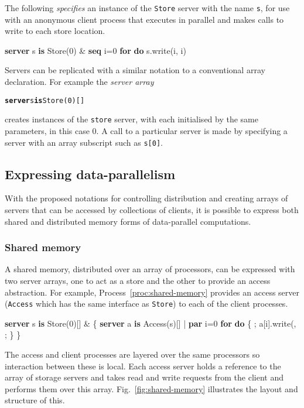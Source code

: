 \documentclass[11pt, conference, compsocconf, onecolumn]{IEEEtran}
\newcommand{\ttt}[1]{\texttt{#1}}
\newcommand{\fig}[1]{Fig.~\ref{fig:#1}}
\newcommand{\proc}[1]{Process~\ref{proc:#1}}
\newcounter{process}
\newenvironment{Process}[1][]{\begin{procfloat}[ht]\vspace{-1.5mm}\refstepcounter{process}{\bf Process~\theprocess} #1}
{\vspace{-3.5mm}\end{procfloat}}
\newcommand{\w}[1]{{\bf #1}}
\newcommand{\inputtikz}[1]{
\begin{center}\end{center}}
\def\codespacing{1.5mm}
\newenvironment{myquote}
{\list{}{\leftmargin=4mm\rightmargin=4mm}\item[]}
{\endlist}
\newenvironment{code*}{\vspace{\codespacing}\begin{myquote}\begin{minipage}{\linewidth}\begin{alltt}}
{\end{alltt}\end{minipage}
\end{myquote}\vspace{\codespacing}
}
\newcommand{\code}[1]{
\vspace{\codespacing}\begin{myquote}\begin{alltt}#1\end{alltt}\end{myquote}\vspace{\codespacing}
}
\begin{document}
The following \emph{specifies} an instance of the \ttt{Store} server with the
name \ttt{s}, for use with an anonymous client process that executes in
parallel and makes calls to write to each store location.
\begin{code*}
\w{server} s \w{is} Store(0) \&
\w{seq} i=0 \w{for}  \w{do} s.write(i, i)
\end{code*}

Servers can be replicated with a similar notation to a conventional array
declaration. For example the \emph{server array}
\code{\w{server} s \w{is} Store(0)[]\\}
creates  instances of the \ttt{store} server, with each initialised by the
same parameters, in this case 0.  A call to a particular server is made by
specifying a server with an array subscript such as \ttt{s[0]}.
\inputtikz{figures/server-replicated}

\subsection{Expressing data-parallelism}

With the proposed notations for controlling distribution and creating arrays of
servers that can be accessed by collections of clients, it is possible to
express both shared and distributed memory forms of data-parallel computations.

\subsubsection{Shared memory}

A shared memory, distributed over an array of processors, can be expressed with
two server arrays, one to act as a store and the other to provide an access
abstraction.
For example, \proc{shared-memory} provides an access server (\ttt{Access} which
has the same interface as \ttt{Store}) to each of the  client processes.
\begin{Process}
\begin{code*}
\w{server} s \w{is} Store(0)[] &
\{ \w{server} a \w{is} Access(s)[] |
  \w{par} i=0 \w{for}  \w{do}
  \{ ; a[i].write(, ;  \}
\}
\end{code*}
\label{proc:shared-memory}
\end{Process}
The access and client processes are layered over the same processors so
interaction between these is local. Each access server holds a reference to the
array of  storage servers and takes read and write requests from the client and
performs them over this array. \fig{shared-memory} illustrates the layout and
structure of this.
\end{document}
